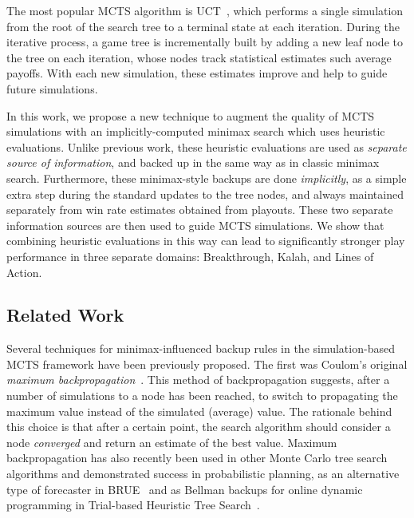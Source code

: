 \documentclass{article}
\begin{document}
The most popular MCTS algorithm is UCT~\cite{Kocsis06Bandit}, 
which performs a single simulation from the root of the search tree to a terminal state at each iteration. 
During the iterative process, a game tree is incrementally built by adding a 
new leaf node to the tree on each iteration, whose nodes track statistical estimates such average payoffs. 
With each new simulation, these estimates improve and help to guide future simulations. 


In this work, we propose a new technique to augment the quality of MCTS simulations with  
an implicitly-computed minimax search which uses heuristic evaluations. 
Unlike previous work, these heuristic evaluations are used as {\it separate source of information}, 
and backed up in the same way as in classic minimax search. Furthermore, these minimax-style 
backups are done {\it implicitly},
as a simple extra step during the standard updates to the tree nodes, and always maintained 
separately from win rate estimates obtained from playouts. These two separate information 
sources are then used to guide MCTS simulations. 
We show that combining heuristic evaluations in this way can lead to significantly stronger play performance in three 
separate domains: Breakthrough, Kalah, and Lines of Action. 

\subsection{Related Work}

Several techniques for minimax-influenced backup rules in the simulation-based MCTS framework have been previously proposed. 
The first was Coulom's original {\it maximum backpropagation}~\cite{Coulom06Efficient}. This method of backpropagation
suggests, after a number of simulations to a node has been reached, to switch to propagating the maximum value instead 
of the simulated (average) value. 
The rationale behind this choice is that after a certain point, the search algorithm should consider a node
{\it converged} and return an estimate of the best value. 
Maximum backpropagation has also recently been used in other Monte Carlo tree search algorithms and demonstrated success in
probabilistic planning, as an alternative type of forecaster in BRUE~\cite{Feldman13Theoretically} and as Bellman 
backups for online dynamic programming in Trial-based Heuristic Tree Search~\cite{Keller13Trial}.
\end{document}
